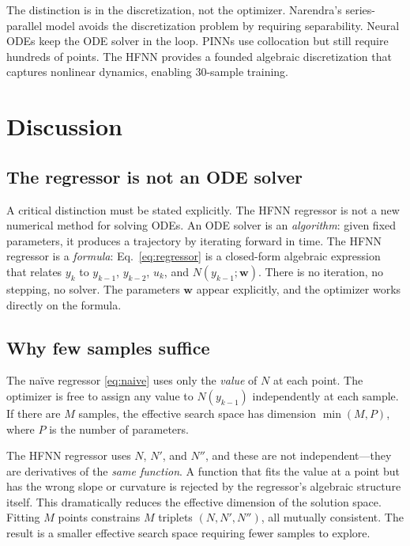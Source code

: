 \documentclass[preprint,12pt]{elsarticle}
\begin{document}
The distinction is in the discretization, not the optimizer. Narendra's series-parallel model avoids the discretization problem by requiring separability. Neural ODEs keep the ODE solver in the loop. PINNs use collocation but still require hundreds of points. The HFNN provides a founded algebraic discretization that captures nonlinear dynamics, enabling 30-sample training.


\section{Discussion}
\label{sec:discussion}

\subsection{The regressor is not an ODE solver}
A critical distinction must be stated explicitly. The HFNN regressor is not a new numerical method for solving ODEs. An ODE solver is an \emph{algorithm}: given fixed parameters, it produces a trajectory by iterating forward in time. The HFNN regressor is a \emph{formula}: Eq.~\eqref{eq:regressor} is a closed-form algebraic expression that relates $y_k$ to $y_{k-1}$, $y_{k-2}$, $u_k$, and $N(y_{k-1};\mathbf{w})$. There is no iteration, no stepping, no solver. The parameters $\mathbf{w}$ appear explicitly, and the optimizer works directly on the formula.

\subsection{Why few samples suffice}
The na\"ive regressor \eqref{eq:naive} uses only the \emph{value} of $N$ at each point. The optimizer is free to assign any value to $N(y_{k-1})$ independently at each sample. If there are $M$ samples, the effective search space has dimension $\min(M, P)$, where $P$ is the number of parameters.

The HFNN regressor uses $N$, $N'$, and $N''$, and these are not independent---they are derivatives of the \emph{same function}. A function that fits the value at a point but has the wrong slope or curvature is rejected by the regressor's algebraic structure itself. This dramatically reduces the effective dimension of the solution space. Fitting $M$ points constrains $M$ triplets $(N, N', N'')$, all mutually consistent. The result is a smaller effective search space requiring fewer samples to explore.
\end{document}
